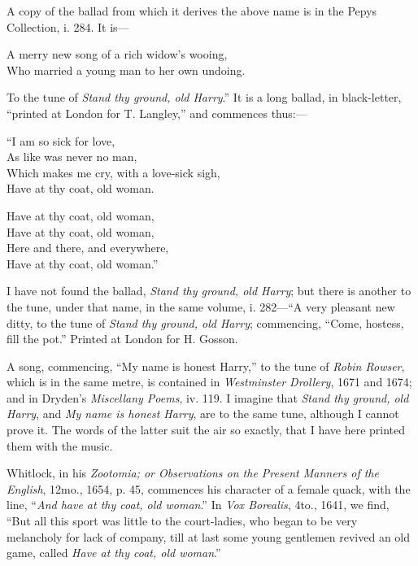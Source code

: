 A copy of the ballad from which it derives the above name is in the Pepys
Collection, i. 284. It is—
\settowidth{\versewidth}{Who married a young man to her own undoing.}
\begin{scverse}
A merry new song of a rich widow’s wooing,\\
Who married a young man to her own undoing.
\end{scverse}
To the tune of \textit{Stand thy ground, old Harry}.” It is a long ballad, in black-letter, 
“printed at London for T. Langley,” and commences thus:—
\settowidth{\versewidth}{Which makes me cry, with a love-sick sigh,}

\begin{dcverse}\begin{altverse}
“I am so sick for love,\\
As like was never no man, \\
Which makes me cry, with a love-sick sigh,\\
Have at thy coat, old woman.\\
\end{altverse}

Have at thy coat, old woman,\\
Have at thy coat, old woman,\\
Here and there, and everywhere,\\
Have at thy coat, old woman.”
\end{dcverse}


I have not found the ballad, \textit{Stand thy ground, old Harry}; but there is another
to the tune, under that name, in the same volume, i. 282—“A very pleasant
new ditty, to the tune of \textit{Stand thy ground, old Harry}; commencing, “Come,
hostess, fill the pot.” Printed at London for H. Gosson.

A song, commencing, “My name is honest Harry,” to the tune of \textit{Robin
Rowser}, which is in the same metre, is contained in \textit{Westminster Drollery}, 1671
and 1674; and in Dryden’s \textit{Miscellany Poems}, iv. 119. I imagine that \textit{Stand
thy ground, old Harry}, and \textit{My name is honest Harry}, are to the same tune,
although I cannot prove it. The words of the latter suit the air so exactly, that
I have here printed them with the music.

Whitlock, in his \textit{Zootomia; or Observations on the Present Manners of the
English}, 12mo., 1654, p. 45, commences his character of a female quack, with
the line, “\textit{And have at thy coat, old woman}.” In \textit{Vox Borealis}, 4to., 1641, we
find, “But all this sport was little to the court-ladies, who began to be very
melancholy for lack of company, till at last some young gentlemen revived an old
game, called \textit{Have at thy coat, old woman}.”

